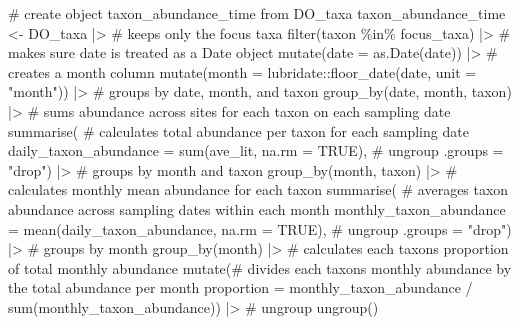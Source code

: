 \documentclass[
  letterpaper,
  DIV=11,
  numbers=noendperiod]{scrartcl}
\newenvironment{Shaded}{\begin{snugshade}}{\end{snugshade}}
\newcommand{\AttributeTok}[1]{\textcolor[rgb]{0.40,0.45,0.13}{#1}}
\newcommand{\CommentTok}[1]{\textcolor[rgb]{0.37,0.37,0.37}{#1}}
\newcommand{\ConstantTok}[1]{\textcolor[rgb]{0.56,0.35,0.01}{#1}}
\newcommand{\FunctionTok}[1]{\textcolor[rgb]{0.28,0.35,0.67}{#1}}
\newcommand{\NormalTok}[1]{\textcolor[rgb]{0.00,0.23,0.31}{#1}}
\newcommand{\OtherTok}[1]{\textcolor[rgb]{0.00,0.23,0.31}{#1}}
\newcommand{\SpecialCharTok}[1]{\textcolor[rgb]{0.37,0.37,0.37}{#1}}
\newcommand{\StringTok}[1]{\textcolor[rgb]{0.13,0.47,0.30}{#1}}
\begin{document}
\begin{Shaded}
\begin{Highlighting}[]
\CommentTok{\# create object taxon\_abundance\_time from DO\_taxa}
\NormalTok{taxon\_abundance\_time }\OtherTok{\textless{}{-}}\NormalTok{ DO\_taxa }\SpecialCharTok{|\textgreater{}}
  \CommentTok{\# keeps only the focus taxa}
  \FunctionTok{filter}\NormalTok{(taxon }\SpecialCharTok{\%in\%}\NormalTok{ focus\_taxa) }\SpecialCharTok{|\textgreater{}}
  \CommentTok{\# makes sure date is treated as a Date object}
  \FunctionTok{mutate}\NormalTok{(}\AttributeTok{date =} \FunctionTok{as.Date}\NormalTok{(date)) }\SpecialCharTok{|\textgreater{}}
  \CommentTok{\# creates a month column}
  \FunctionTok{mutate}\NormalTok{(}\AttributeTok{month =}\NormalTok{ lubridate}\SpecialCharTok{::}\FunctionTok{floor\_date}\NormalTok{(date, }\AttributeTok{unit =} \StringTok{"month"}\NormalTok{)) }\SpecialCharTok{|\textgreater{}}
  \CommentTok{\# groups by date, month, and taxon }
  \FunctionTok{group\_by}\NormalTok{(date, month, taxon) }\SpecialCharTok{|\textgreater{}}
  \CommentTok{\# sums abundance across sites for each taxon on each sampling date}
  \FunctionTok{summarise}\NormalTok{(}
    \CommentTok{\# calculates total abundance per taxon for each sampling date}
    \AttributeTok{daily\_taxon\_abundance =} \FunctionTok{sum}\NormalTok{(ave\_lit, }\AttributeTok{na.rm =} \ConstantTok{TRUE}\NormalTok{),}
    \CommentTok{\# ungroup}
    \AttributeTok{.groups =} \StringTok{"drop"}\NormalTok{) }\SpecialCharTok{|\textgreater{}}
  \CommentTok{\# groups by month and taxon}
  \FunctionTok{group\_by}\NormalTok{(month, taxon) }\SpecialCharTok{|\textgreater{}}
  \CommentTok{\# calculates monthly mean abundance for each taxon}
  \FunctionTok{summarise}\NormalTok{(}
    \CommentTok{\# averages taxon abundance across sampling dates within each month}
    \AttributeTok{monthly\_taxon\_abundance =} \FunctionTok{mean}\NormalTok{(daily\_taxon\_abundance, }\AttributeTok{na.rm =} \ConstantTok{TRUE}\NormalTok{),}
    \CommentTok{\# ungroup}
    \AttributeTok{.groups =} \StringTok{"drop"}\NormalTok{) }\SpecialCharTok{|\textgreater{}}
  \CommentTok{\# groups by month }
  \FunctionTok{group\_by}\NormalTok{(month) }\SpecialCharTok{|\textgreater{}}
  \CommentTok{\# calculates each taxon\textquotesingle{}s proportion of total monthly abundance}
  \FunctionTok{mutate}\NormalTok{(}\CommentTok{\# divides each taxon\textquotesingle{}s monthly abundance by the total abundance per month}
    \AttributeTok{proportion =}\NormalTok{ monthly\_taxon\_abundance }\SpecialCharTok{/} \FunctionTok{sum}\NormalTok{(monthly\_taxon\_abundance)) }\SpecialCharTok{|\textgreater{}}
  \CommentTok{\# ungroup}
  \FunctionTok{ungroup}\NormalTok{()}


\end{Highlighting}
\end{Shaded}
\end{document}
